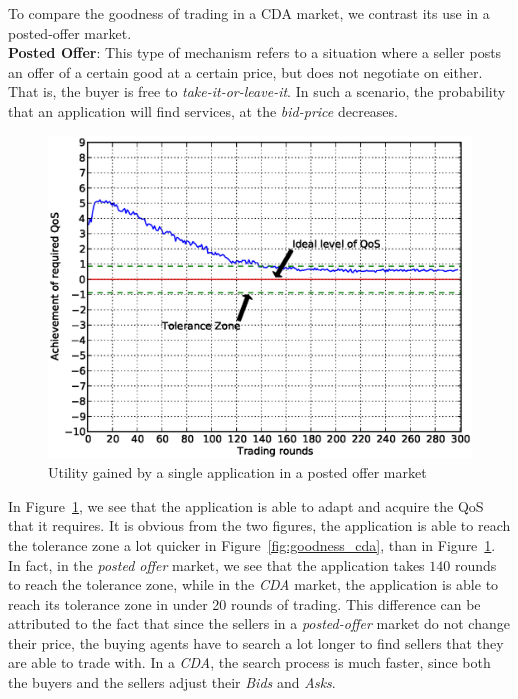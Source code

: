 \documentclass[10pt,journal,compsoc]{IEEEtran}
\begin{document}
To compare the goodness of trading in a CDA market, we contrast its use in a posted-offer market.\\
\textbf{Posted Offer}: This type of mechanism refers to a situation where a seller posts an offer of a certain good at a certain price, but does not negotiate on either. That is, the buyer is free to \textit{take-it-or-leave-it}.  In such a scenario, the probability that an application will find services, at the \textit{bid-price} decreases. 

\begin{figure}[h]
	\centering
	\includegraphics[scale=0.45]{Figure8.eps}
	\caption{Utility gained by a single application in a posted offer market \label{fig:goodness_posted_offer}}
\end{figure}

In Figure~\ref{fig:goodness_posted_offer}, we see that the application is able to adapt and acquire the QoS that it requires. It is obvious from the two figures, the application is able to reach the tolerance zone a lot quicker in Figure~\ref{fig:goodness_cda}, than in Figure~\ref{fig:goodness_posted_offer}. In fact, in the \textit{posted offer} market, we see that the application takes $140$ rounds to reach the tolerance zone, while in the \textit{CDA} market, the application is able to reach its tolerance zone in under 20 rounds of trading. This difference can be attributed to the fact that since the sellers in a \textit{posted-offer} market do not change their price, the buying agents have to search a lot longer to find sellers that they are able to trade with. In a \textit{CDA}, the search process is much faster, since both the buyers and the sellers adjust their \textit{Bids} and \textit{Asks}.
\end{document}
